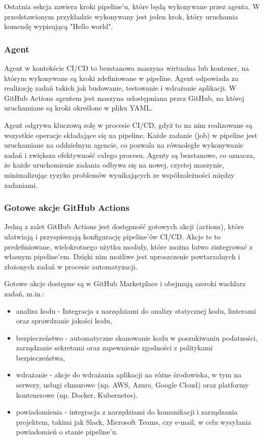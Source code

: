 \documentclass{article}
\begin{document}
Ostatnia sekcja zawiera kroki pipeline’u, które będą wykonywane przez agenta. W przedstawionym przykładzie wykonywany jest jeden krok, który uruchamia komendę wypisującą "Hello world".

\subsubsection{Agent}

Agent w kontekście CI/CD to bezstanowa maszyna wirtualna lub kontener, na którym wykonywane są kroki zdefiniowane w pipeline. Agent odpowiada za realizację zadań takich jak budowanie, testowanie i wdrażanie aplikacji. W GitHub Actions agentem jest maszyna udostępniana przez GitHub, na której uruchamiane są kroki określone w pliku YAML.

Agent odgrywa kluczową rolę w procesie CI/CD, gdyż to na nim realizowane są wszystkie operacje składające się na pipeline. Każde zadanie (job) w pipeline jest uruchamiane na oddzielnym agencie, co pozwala na równoległe wykonywanie zadań i zwiększa efektywność całego procesu. Agenty są bezstanowe, co oznacza, że każde uruchomienie zadania odbywa się na nowej, czystej maszynie, minimalizując ryzyko problemów wynikających ze współzależności między zadaniami.

\subsubsection{Gotowe akcje GitHub Actions} \label{gotoweAkcje}

Jedną z zalet GitHub Actions jest dostępność gotowych akcji (actions), które ułatwiają i przyspieszają konfigurację pipeline'ów CI/CD. Akcje te to predefiniowane, wielokrotnego użytku moduły, które można łatwo zintegrować z własnym pipeline’em. Dzięki nim możliwe jest uproszczenie powtarzalnych i złożonych zadań w procesie automatyzacji.

Gotowe akcje dostępne są w GitHub Marketplace i obejmują szeroki wachlarz zadań, m.in.:

\begin{itemize}
\item analiza kodu - Integracja z narzędziami do analizy statycznej kodu, linterami oraz sprawdzanie jakości kodu,
\item bezpieczeństwo - automatyczne skanowanie kodu w poszukiwaniu podatności, zarządzanie sekretami oraz zapewnienie zgodności z politykami bezpieczeństwa,
\item wdrażanie - akcje do wdrażania aplikacji na różne środowiska, w tym na serwery, usługi chmurowe (np. AWS, Azure, Google Cloud) oraz platformy kontenerowe (np. Docker, Kubernetes).
\item powiadomienia - integracja z narzędziami do komunikacji i zarządzania projektem, takimi jak Slack, Microsoft Teams, czy e-mail, w celu wysyłania powiadomień o stanie pipeline'u.
\end{itemize}
\end{document}
